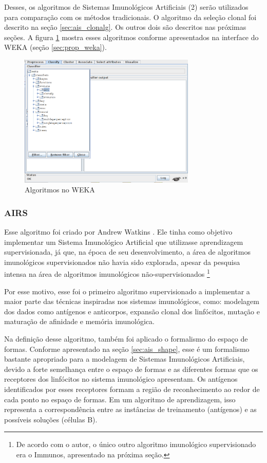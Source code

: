 Desses, os algoritmos de Sistemas Imunológicos Artificiais (2) serão utilizados para comparação com os métodos tradicionais. O algoritmo da seleção clonal foi descrito na seção \ref{sec:ais_clonalg}. Os outros dois são descritos nas próximas seções. A figura \ref{fig:prop_wekaais} mostra esses algoritmos conforme apresentados na interface do WEKA (seção \ref{sec:prop_weka}).

\begin{figure}[h!]
\centering
\includegraphics[width=0.75\textwidth]{img/weka_ais.png}
\caption{Algoritmos no WEKA}
\label{fig:prop_wekaais}
\end{figure}

\subsubsection{AIRS}
\label{sec:prop_airs}

Esse algoritmo foi criado por Andrew Watkins \cite{Andrew2003}. Ele tinha como objetivo implementar um Sistema Imunológico Artificial que utilizasse aprendizagem supervisionada, já que, na época de seu desenvolvimento, a área de algoritmos imunológicos supervisionados não havia sido explorada, apesar da pesquisa intensa na área de algoritmos imunológicos não-supervisionados \footnote{De acordo com o autor, o único outro algoritmo imunológico supervisionado era o Immunos, apresentado na próxima seção.}

Por esse motivo, esse foi o primeiro algoritmo supervisionado a implementar a maior parte das técnicas inspiradas nos sistemas imunológicos, como: modelagem dos dados como antígenos e anticorpos, expansão clonal dos linfócitos, mutação e maturação de afinidade e memória imunológica.

Na definição desse algoritmo, também foi aplicado o formalismo do espaço de formas. Conforme apresentado na seção \ref{sec:ais_shape}, esse é um formalismo bastante apropriado para a modelagem de Sistemas Imunológicos Artificiais, devido a forte semelhança entre o espaço de formas e as diferentes formas que os receptores dos linfócitos no sistema imunológico apresentam. Os antígenos identificados por esses receptores formam a região de reconhecimento ao redor de cada ponto no espaço de formas. Em um algoritmo de aprendizagem, isso representa a correspondência entre as instâncias de treinamento (antígenos) e as possíveis soluções (células B).

